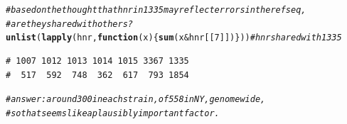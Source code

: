 \documentclass{article}\usepackage[]{graphicx}\usepackage[]{color}
\makeatletter
\newcommand{\hlnum}[1]{\textcolor[rgb]{0.686,0.059,0.569}{#1}}%
\newcommand{\hlcom}[1]{\textcolor[rgb]{0.678,0.584,0.686}{\textit{#1}}}%
\newcommand{\hlopt}[1]{\textcolor[rgb]{0,0,0}{#1}}%
\newcommand{\hlstd}[1]{\textcolor[rgb]{0.345,0.345,0.345}{#1}}%
\newcommand{\hlkwa}[1]{\textcolor[rgb]{0.161,0.373,0.58}{\textbf{#1}}}%
\newcommand{\hlkwc}[1]{\textcolor[rgb]{0.333,0.667,0.333}{#1}}%
\newcommand{\hlkwd}[1]{\textcolor[rgb]{0.737,0.353,0.396}{\textbf{#1}}}%
\newenvironment{kframe}{%
 \def\at@end@of@kframe{}%
 \ifinner\ifhmode%
  \def\at@end@of@kframe{\end{minipage}}%
  \begin{minipage}{\columnwidth}%
 \fi\fi%
 \def\FrameCommand##1{\hskip\@totalleftmargin \hskip-\fboxsep
 \colorbox{shadecolor}{##1}\hskip-\fboxsep
     \hskip-\linewidth \hskip-\@totalleftmargin \hskip\columnwidth}%
 \MakeFramed {\advance\hsize-\width
   \@totalleftmargin\z@ \linewidth\hsize
   \@setminipage}}%
 {\par\unskip\endMakeFramed%
 \at@end@of@kframe}
\newenvironment{knitrout}{}{} %
\makeatother
\begin{document}
\begin{knitrout}\footnotesize
{}\color{fgcolor}\begin{kframe}
\begin{alltt}
\hlcom{# based on the thought that hnr in 1335 may reflect errors in the ref seq, }
\hlcom{# are they shared with others?}
\hlkwd{unlist}\hlstd{(}\hlkwd{lapply}\hlstd{(hnr,} \hlkwa{function}\hlstd{(}\hlkwc{x}\hlstd{)\{}\hlkwd{sum}\hlstd{(x} \hlopt{&} \hlstd{hnr[[}\hlnum{7}\hlstd{]])\}))}                 \hlcom{# hnr shared with 1335}
\end{alltt}
\begin{verbatim}
# 1007 1012 1013 1014 1015 3367 1335 
#  517  592  748  362  617  793 1854
\end{verbatim}
\begin{alltt}
\hlcom{# answer: around 300 in each strain, of 558 in NY, genomewide, }
\hlcom{# so that seems like a plausibly important factor.}


\end{alltt}
\end{kframe}
\end{knitrout}
\end{document}
